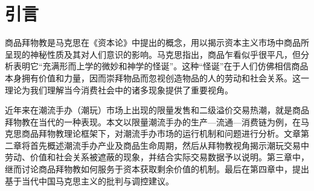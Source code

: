 
\chapter{引言}
商品拜物教是马克思在《资本论》中提出的概念，用以揭示资本主义市场中商品所呈现的神秘性质及其对人们意识的影响\cite{dekaer.makesi2012zibenlun}。马克思指出，商品乍看似乎很平凡，但分析表明它“充满形而上学的微妙和神学的怪诞”。这种“怪诞”在于人们仿佛相信商品本身拥有价值和力量，因而崇拜物品而忽视创造物品的人的劳动和社会关系\cite{song2024guan}。这一理论为我们理解当今消费社会中的诸多现象提供了重要视角。

近年来在潮流手办（潮玩）市场上出现的限量发售和二级溢价交易热潮，就是商品拜物教在当代的一种表现\cite{WJXB202502001,XJZS202406003,MYSD202406008}。本文以限量潮流手办的生产—流通—消费链为例，在马克思商品拜物教理论框架下，对潮流手办市场的运行机制和问题进行分析。文章第二章将首先概述潮流手办产业及商品生命周期，然后从拜物教视角揭示潮玩交易中劳动、价值和社会关系被遮蔽的现象，并结合实际交易数据予以说明。第三章中，继而讨论商品拜物教如何服务于资本获取剩余价值的机制。最后在第四章中，提出基于当代中国马克思主义的批判与调控建议。